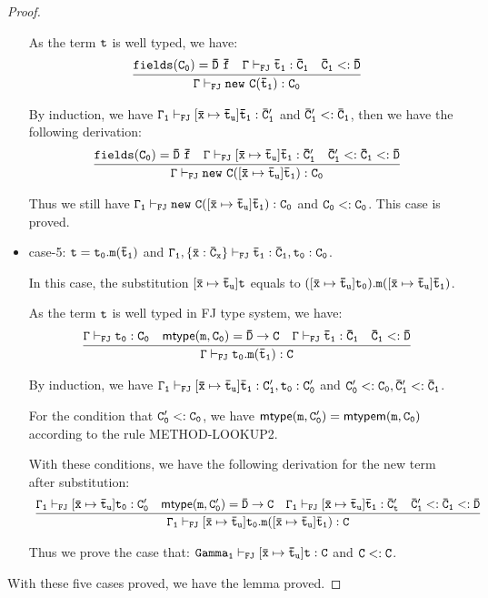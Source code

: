 \documentclass[letterpaper]{article}
\begin{document}
\begin{proof}
\begin{itemize}
As the term $\tt t$ is well typed, we have:
\[
    \begin{array}{c c c}
      \infer
      {\tt \Gamma\vdash_{FJ} new~C(\bar{t}_1):C_0}
      {\tt fields(C_0)=\bar{D}~\bar{f}
      &\tt \Gamma\vdash_{FJ} \bar{t}_1:\bar{C}_1
      &\tt \bar{C}_1 <: \bar{D}
      }
    \end{array}
\]

By induction, we have $\tt \Gamma_1\vdash_{FJ} [\bar{x}\mapsto\bar{t}_u]\bar{t}_1:\bar{C}'_1$ and $\tt \bar{C}'_1 <: \bar{C}_1$, then we have the following derivation:
\[
  \begin{array}{c c c}
    \infer
    {\tt \Gamma\vdash_{FJ}new~C([\bar{x}\mapsto\bar{t}_u]\bar{t}_1):C_0}
    {\tt fields(C_0)=\bar{D}~\bar{f}
    &\tt \Gamma\vdash_{FJ}[\bar{x}\mapsto\bar{t}_u]\bar{t}_1:\bar{C}'_1
    &\tt \bar{C}'_1<:\bar{C}_1<:\bar{D}}
  \end{array}
\]

Thus we still have $\tt \Gamma_1\vdash_{FJ}new~C([\bar{x}\mapsto \bar{t}_u]\bar{t}_1):C_0$ and $\tt C_0 <: C_0$. This case is proved.

\item case-5: $\tt t=t_0.m(\bar{t}_1)$ and $\tt \Gamma_1,\{\bar{x}:\bar{C}_x\}\vdash_{FJ}\bar{t}_1:\bar{C}_1,t_0:C_0$.

In this case, the substitution $\tt[\bar{x}\mapsto\bar{t}_u]t$ equals to $\tt ([\bar{x}\mapsto\bar{t}_u]t_0).m([\bar{x}\mapsto\bar{t}_u]\bar{t}_1)$.

As the term $\tt t$ is well typed in FJ type system, we have:
\[
  \begin{array}{c c c c}
    \infer
    {\tt\Gamma\vdash_{FJ}t_0.m(\bar{t}_1):C}
    {\tt \Gamma\vdash_{FJ}t_0:C_0
    &\tt \mathsf{mtype}(m,C_0) = \bar{D}\rightarrow C
    &\tt \Gamma\vdash_{FJ}\bar{t}_1:\bar{C}_1
    &\tt \bar{C}_1 <:\bar{D}
    }
  \end{array}
\]

By induction, we have $\tt\Gamma_1\vdash_{FJ}[\bar{x}\mapsto\bar{t}_u]\bar{t}_1:C'_1, t_0:C'_0$ and $\tt C'_0 <: C_0, \bar{C}'_1 <:\bar{C}_1$.

For the condition that $\tt C'_0 <: C_0$, we have $\tt \mathsf{mtype}(m,C'_0)=\mathsf{mtypem}(m,C_0)$ according to the rule METHOD-LOOKUP2.

With these conditions, we have the following derivation for the new term after substitution:
\[
  \begin{array}{c c c c}
  \infer
  {\tt \Gamma_1\vdash_{FJ}[\bar{x}\mapsto \bar{t}_u]t_0.m([\bar{x}\mapsto \bar{t}_u]\bar{t}_1):C}
  {\tt \Gamma_1\vdash_{FJ}[\bar{x}\mapsto \bar{t}_u]t_0:C'_0
  &\tt \mathsf{mtype}(m, C'_0)=\bar{D}\rightarrow C
  &\tt \Gamma_1\vdash_{FJ}[\bar{x}\mapsto \bar{t}_u]\bar{t}_1:\bar{C}'_t
  &\tt \bar{C}'_1<:\bar{C}_1<:\bar{D}}
  \end{array}
\]

Thus we prove the case that: $\tt Gamma_1\vdash_{FJ}[\bar{x}\mapsto \bar{t}_u]t:C$ and $\tt C<:C$.
\end{itemize}

With these five cases proved, we have the lemma proved.
\end{proof}
\end{document}
